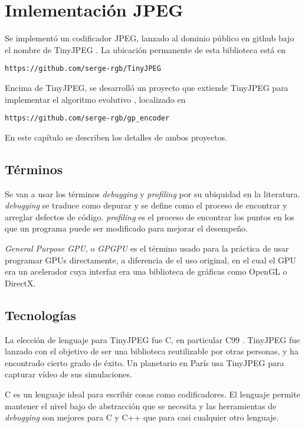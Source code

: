 \chapter{Imlementación JPEG}\label{ch:implementacion}

Se implementó un codificador JPEG, lanzado al dominio público en github bajo el
nombre de TinyJPEG \cite{tiny_jpeg}. La ubicación permanente de esta biblioteca
está en \begin{alltt}https://github.com/serge-rgb/TinyJPEG \end{alltt}

Encima de TinyJPEG, se desarrolló un proyecto que extiende TinyJPEG para
implementar el algoritmo evolutivo \cite{gp_encoder}, localizado en
\begin{alltt}https://github.com/serge-rgb/gp_encoder\end{alltt}

En este capítulo se describen los detalles de ambos proyectos.

\section {Términos}
Se van a usar los términos \emph{debugging} y \emph{profiling} por su ubiquidad
en la literatura. \emph{debugging} se traduce como depurar y se define como el
proceso de encontrar y arreglar defectos de código. \emph{profiling} es el
proceso de encontrar los puntos en los que un programa puede ser modificado
para mejorar el desempeño.

\emph{General Purpose GPU}, o \emph{GPGPU} es el
término usado para la práctica de usar programar GPUs directamente, a
diferencia de el uso original, en el cual el GPU era un acelerador cuya
interfaz era una biblioteca de gráficas como OpenGL o DirectX.

\section{Tecnologías}

La elección de lenguaje para TinyJPEG fue C, en particular C99 \cite{c99}.
TinyJPEG fue lanzado con el objetivo de ser una biblioteca reutilizable por
otras personas, y ha encontrado cierto grado de éxito. Un planetario en París
usa TinyJPEG para capturar vídeo de sus simulaciones.

C es un lenguaje ideal para escribir cosas como codificadores. El lenguaje
permite mantener el nivel bajo de abstracción que se necesita y las
herramientas de \emph{debugging} son mejores para C y C++ que para casi
cualquier otro lenguaje.

